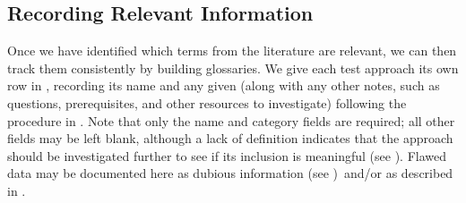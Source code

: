 \ifnotpaper\newpage\fi
\subsection{Recording Relevant Information}\label{record-info}


Once we have identified which terms from the literature are relevant, we can
then track them consistently %
by building glossaries. %
We give each test approach its own row in \ourApproachGlossary{}, recording its
name and any given \approachFields*{} (along with any other notes, such as
questions, prerequisites, and other resources to investigate) following the
procedure in .
Note that only the name and category fields are required; all other fields
may be left blank, although a lack of definition indicates that the approach
should be investigated further to see if its inclusion is meaningful (see
). Flawed data may be documented here as dubious information
(see )\ifnotpaper\ and/or as described in \fi.


